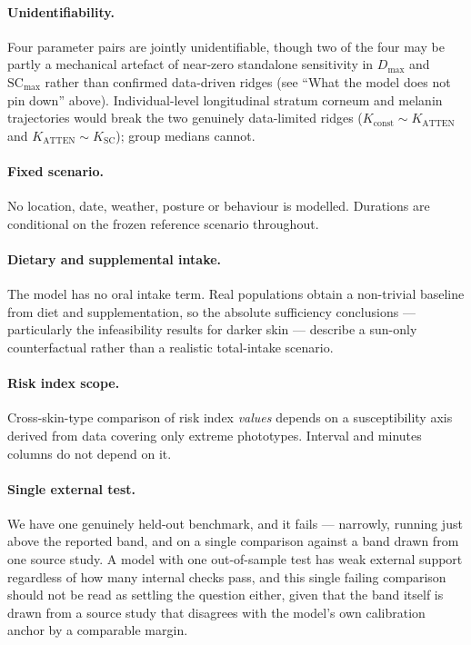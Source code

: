\documentclass[11pt]{article}
\begin{document}
\paragraph{Unidentifiability.} Four parameter pairs are jointly
unidentifiable, though two of the four may be partly a mechanical
artefact of near-zero standalone sensitivity in $D_{\max}$ and
$\mathrm{SC}_{\max}$ rather than confirmed data-driven ridges (see
``What the model does not pin down'' above). Individual-level
longitudinal stratum corneum and melanin trajectories would break the
two genuinely data-limited ridges ($K_{\mathrm{const}} \sim
K_{\mathrm{ATTEN}}$ and $K_{\mathrm{ATTEN}} \sim K_{\mathrm{SC}}$);
group medians cannot.

\paragraph{Fixed scenario.} No location, date, weather, posture or
behaviour is modelled. Durations are conditional on the frozen
reference scenario throughout.

\paragraph{Dietary and supplemental intake.} The model has no oral
intake term. Real populations obtain a non-trivial baseline from diet
and supplementation, so the absolute sufficiency conclusions
--- particularly the infeasibility results for darker skin --- describe
a sun-only counterfactual rather than a realistic total-intake
scenario.

\paragraph{Risk index scope.} Cross-skin-type comparison of risk index
\emph{values} depends on a susceptibility axis derived from data
covering only extreme phototypes. Interval and minutes columns do not
depend on it.

\paragraph{Single external test.} We have one genuinely held-out
benchmark, and it fails --- narrowly, running just above the reported
band, and on a single comparison against a band drawn from one source
study. A model with one out-of-sample test has weak external support
regardless of how many internal checks pass, and this single failing
comparison should not be read as settling the question either, given
that the band itself is drawn from a source study that disagrees with
the model's own calibration anchor by a comparable margin.
\end{document}
